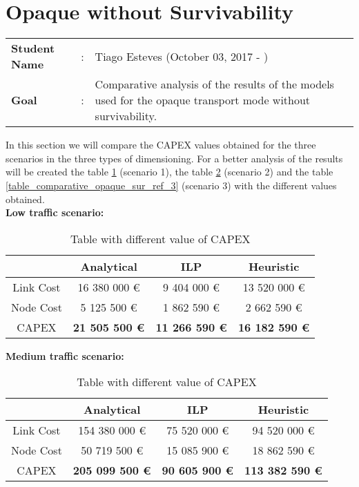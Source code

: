 \clearpage

\section{Opaque without Survivability}\label{comparative_Opaque_Survivability}
\begin{tcolorbox}	
\begin{tabular}{p{2.75cm} p{0.2cm} p{10.5cm}} 	
\textbf{Student Name}  &:& Tiago Esteves    (October 03, 2017 - )\\
\textbf{Goal}          &:& Comparative analysis of the results of the models used for the opaque transport mode without survivability.
\end{tabular}
\end{tcolorbox}
\vspace{11pt}


In this section we will compare the CAPEX values obtained for the three scenarios in the three types of dimensioning. For a better analysis of the results will be created the table \ref{table_comparative_opaque_sur_ref_1} (scenario 1), the table \ref{table_comparative_opaque_sur_ref_2} (scenario 2) and the table \ref{table_comparative_opaque_sur_ref_3} (scenario 3) with the different values obtained.\\

\textbf{Low traffic scenario:}

\begin{table}[h!]
\centering
\begin{tabular}{| c | c | c | c |}
 \hline
   & Analytical & ILP & Heuristic \\
 \hline\hline
 Link Cost & 16 380 000 \euro & 9 404 000 \euro & 13 520 000 \euro \\
 Node Cost & 5 125 500 \euro & 1 862 590 \euro & 2 662 590 \euro \\
 CAPEX & \textbf{21 505 500 \euro} & \textbf{11 266 590 \euro} & \textbf{16 182 590 \euro} \\
 \hline
\end{tabular}
\caption{Table with different value of CAPEX }
\label{table_comparative_opaque_sur_ref_1}
\end{table}


\vspace{11pt}
\textbf{Medium traffic scenario:}

\begin{table}[h!]
\centering
\begin{tabular}{| c | c | c | c |}
 \hline
   & Analytical & ILP & Heuristic \\
 \hline\hline
 Link Cost & 154 380 000 \euro & 75 520 000 \euro & 94 520 000 \euro \\
 Node Cost & 50 719 500 \euro & 15 085 900 \euro & 18 862 590 \euro \\
 CAPEX & \textbf{205 099 500 \euro} & \textbf{90 605 900 \euro} & \textbf{113 382 590 \euro} \\
 \hline
\end{tabular}
\caption{Table with different value of CAPEX }
\label{table_comparative_opaque_sur_ref_2}
\end{table}



